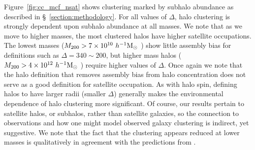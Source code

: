 \documentclass[usenatbib,fleqn]{mnras}
\begin{document}
Figure~\ref{fig:cc_mcf_nsat} shows clustering marked by subhalo abundance as described in 
\S~\ref{section:methodology}. For all values of $\Delta$, halo clustering is strongly dependent 
upon subhalo abundance at all masses. We note that as we move to higher masses, the most clustered halos have higher satellite occupations. The lowest masses ($M_{200} > 7\times10^{10}\ h^{-1}\mathrm{M}_{\odot}~$) show little assembly bias for definitions such as $\Delta = 340 \sim 200$, but higher mass halos ($M_{200} > 4\times10^{12}\ h^{-1}\mathrm{M}_{\odot}~$) require higher values of $\Delta$. Once again we note that the halo definition that removes assembly bias from halo concentration does not serve as a good definition for satellite occupation. As with halo spin, defining halos to have larger radii (smaller 
$\Delta$) generally makes the environmental dependence of halo clustering more 
significant. Of course, our results pertain to satellite halos, or subhalos, rather than 
satellite galaxies, so the connection to observations and how one might 
model observed galaxy clustering is indirect, yet suggestive. We note that the fact that the clustering
appears reduced at lower masses is qualitatively in agreement with the predictions from \citet{wechsler_etal06}. 
\end{document}
